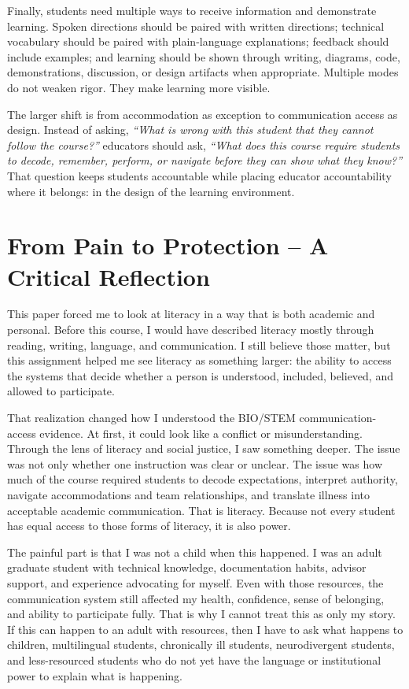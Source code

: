 \documentclass[11pt]{article}
\begin{document}
Finally, students need multiple ways to receive information and demonstrate learning. Spoken directions should be paired with written directions; technical vocabulary should be paired with plain-language explanations; feedback should include examples; and learning should be shown through writing, diagrams, code, demonstrations, discussion, or design artifacts when appropriate. Multiple modes do not weaken rigor. They make learning more visible.

The larger shift is from accommodation as exception to communication access as design. Instead of asking, \textit{“What is wrong with this student that they cannot follow the course?”} educators should ask, \textit{“What does this course require students to decode, remember, perform, or navigate before they can show what they know?”} That question keeps students accountable while placing educator accountability where it belongs: in the design of the learning environment.



\section*{From Pain to Protection -- A Critical Reflection}

This paper forced me to look at literacy in a way that is both academic and personal. Before this course, I would have described literacy mostly through reading, writing, language, and communication. I still believe those matter, but this assignment helped me see literacy as something larger: the ability to access the systems that decide whether a person is understood, included, believed, and allowed to participate.

That realization changed how I understood the BIO/STEM communication-access evidence. At first, it could look like a conflict or misunderstanding. Through the lens of literacy and social justice, I saw something deeper. The issue was not only whether one instruction was clear or unclear. The issue was how much of the course required students to decode expectations, interpret authority, navigate accommodations and team relationships, and translate illness into acceptable academic communication. That is literacy. Because not every student has equal access to those forms of literacy, it is also power.

The painful part is that I was not a child when this happened. I was an adult graduate student with technical knowledge, documentation habits, advisor support, and experience advocating for myself. Even with those resources, the communication system still affected my health, confidence, sense of belonging, and ability to participate fully. That is why I cannot treat this as only my story. If this can happen to an adult with resources, then I have to ask what happens to children, multilingual students, chronically ill students, neurodivergent students, and less-resourced students who do not yet have the language or institutional power to explain what is happening.
\end{document}
